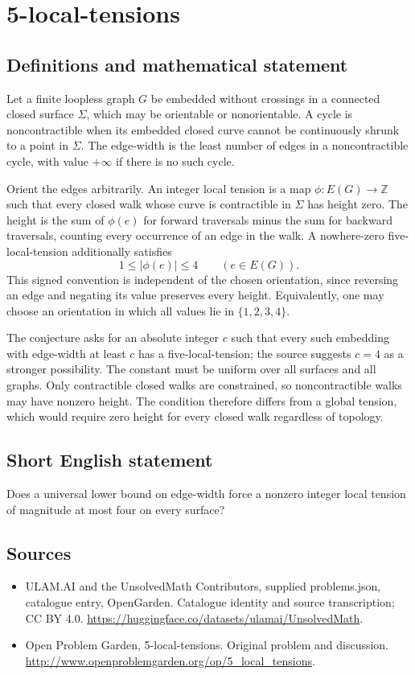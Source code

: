 \documentclass[11pt,a4paper]{article}
\begin{document}
\section*{5-local-tensions}\label{statement}

\subsection{Definitions and mathematical statement}
Let a finite loopless graph $G$ be embedded without crossings in a connected closed surface $\Sigma$, which may be orientable or nonorientable. A cycle is noncontractible when its embedded closed curve cannot be continuously shrunk to a point in $\Sigma$. The edge-width is the least number of edges in a noncontractible cycle, with value $+\infty$ if there is no such cycle.

Orient the edges arbitrarily. An integer local tension is a map $\phi:E(G)\to\mathbb Z$ such that every closed walk whose curve is contractible in $\Sigma$ has height zero. The height is the sum of $\phi(e)$ for forward traversals minus the sum for backward traversals, counting every occurrence of an edge in the walk. A nowhere-zero five-local-tension additionally satisfies
\[
                      1\le|\phi(e)|\le4\qquad(e\in E(G)).
\]
This signed convention is independent of the chosen orientation, since reversing an edge and negating its value preserves every height. Equivalently, one may choose an orientation in which all values lie in $\{1,2,3,4\}$.

The conjecture asks for an absolute integer $c$ such that every such embedding with edge-width at least $c$ has a five-local-tension; the source suggests $c=4$ as a stronger possibility. The constant must be uniform over all surfaces and all graphs. Only contractible closed walks are constrained, so noncontractible walks may have nonzero height. The condition therefore differs from a global tension, which would require zero height for every closed walk regardless of topology.
\subsection{Short English statement}
Does a universal lower bound on edge-width force a nonzero integer local tension of magnitude at most four on every surface?
\subsection{Sources}
\begin{itemize}
\item[S1] ULAM.AI and the UnsolvedMath Contributors, supplied problems.json, catalogue entry, OpenGarden. Catalogue identity and source transcription; CC BY 4.0.
\url{https://huggingface.co/datasets/ulamai/UnsolvedMath}.
\item[S2] Open Problem Garden, 5-local-tensions. Original problem and discussion.
\url{http://www.openproblemgarden.org/op/5_local_tensions}.
\end{itemize}
\end{document}

